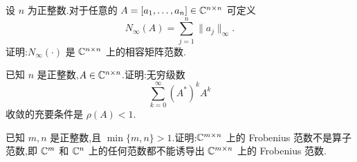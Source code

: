 \begin{problem}[选做]
设 $n$ 为正整数.对于任意的 $A=[a_1,\dots,a_n]\in\mathbb{C}^{n\times n}$ 可定义
\[
    N_{\infty}(A)=\sum_{j=1}^{n}\|a_j\|_{\infty}.
\]
证明:$N_{\infty}(\cdot)$ 是 $\mathbb{C}^{n\times n}$ 上的相容矩阵范数.
\begin{solution}

\end{solution}
\end{problem}

\begin{problem}[选做]
已知 $n$ 是正整数,$A\in\mathbb{C}^{n\times n}$.证明:无穷级数
\[
    \sum_{k=0}^{\infty}(A^*)^kA^k
\]
收敛的充要条件是 $\rho(A)<1$.
\begin{solution}

\end{solution}
\end{problem}

\begin{problem}[选做]
已知 $m,n$ 是正整数,且 $\min\{m,n\}>1$.证明:$\mathbb{C}^{m\times n}$ 上的 Frobenius 范数不是算子范数,即 $\mathbb{C}^m$ 和 $\mathbb{C}^n$ 上的任何范数都不能诱导出 $\mathbb{C}^{m\times n}$ 上的 Frobenius 范数.
\begin{solution}

\end{solution}
\end{problem}
